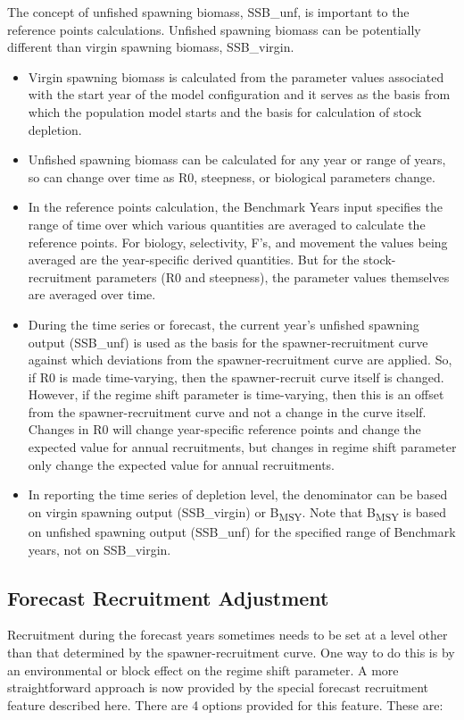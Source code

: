 The concept of unfished spawning biomass, SSB\_unf, is important to the reference points calculations.  Unfished spawning biomass can be potentially different than virgin spawning biomass, SSB\_virgin.
  
\begin{itemize}
	\item Virgin spawning biomass is calculated from the parameter values associated with the start year of the model configuration and it serves as the basis from which the population model starts and the basis for calculation of stock depletion.
	
	\item Unfished spawning biomass can be calculated for any year or range of years, so can change over time as R0, steepness, or biological parameters change.
	
	\item In the reference points calculation, the Benchmark Years input specifies the range of time over which various quantities are averaged to calculate the reference points.  For biology, selectivity, F's, and movement the values being averaged are the year-specific derived quantities.  But for the stock-recruitment parameters (R0 and steepness), the parameter values themselves are averaged over time.
	
	\item During the time series or forecast, the current year's unfished spawning output (SSB\_unf) is used as the basis for the spawner-recruitment curve against which deviations from the spawner-recruitment curve are applied.  So, if R0 is made time-varying, then the spawner-recruit curve itself is changed.  However, if the regime shift parameter is time-varying, then this is an offset from the spawner-recruitment curve and not a change in the curve itself.  Changes in R0 will change year-specific reference points and change the expected value for annual recruitments, but changes in regime shift parameter only change the expected value for annual recruitments.
	
	\item In reporting the time series of depletion level, the denominator can be based on virgin spawning output (SSB\_virgin) or B\textsubscript{MSY}.  Note that B\textsubscript{MSY} is based on unfished spawning output (SSB\_unf) for the specified range of Benchmark years, not on SSB\_virgin.
\end{itemize}


\hypertarget{ForeSpawn}{}
\subsection{Forecast Recruitment Adjustment}
Recruitment during the forecast years sometimes needs to be set at a level other than that determined by the spawner-recruitment curve.  One way to do this is by an environmental or block effect on the regime shift parameter.  A more straightforward approach is now provided by the special forecast recruitment feature described here. There are 4 options provided for this feature.  These are:

